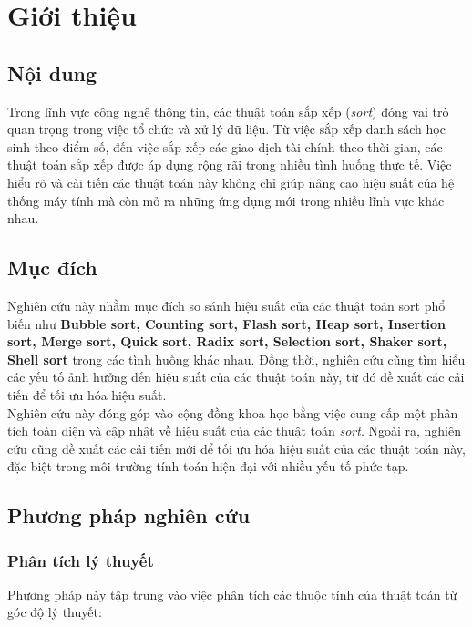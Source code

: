 \section{Giới thiệu}

\subsection{Nội dung}
Trong lĩnh vực công nghệ thông tin, các thuật toán sắp xếp (\textit{sort}) đóng vai trò quan trọng trong việc tổ chức và xử lý dữ liệu. Từ việc sắp xếp danh sách học sinh theo điểm số, đến việc sắp xếp các giao dịch tài chính theo thời gian, các thuật toán sắp xếp được áp dụng rộng rãi trong nhiều tình huống thực tế. Việc hiểu rõ và cải tiến các thuật toán này không chỉ giúp nâng cao hiệu suất của hệ thống máy tính mà còn mở ra những ứng dụng mới trong nhiều lĩnh vực khác nhau.
\subsection{Mục đích}
Nghiên cứu này nhằm mục đích so sánh hiệu suất của các thuật toán sort phổ biến như \textbf{Bubble sort, Counting sort, Flash sort, Heap sort, Insertion sort, Merge sort, Quick sort, Radix sort, Selection sort, Shaker sort, Shell sort} trong các tình huống khác nhau. Đồng thời, nghiên cứu cũng tìm hiểu các yếu tố ảnh hưởng đến hiệu suất của các thuật toán này, từ đó đề xuất các cải tiến để tối ưu hóa hiệu suất.\\
Nghiên cứu này đóng góp vào cộng đồng khoa học bằng việc cung cấp một phân tích toàn diện và cập nhật về hiệu suất của các thuật toán \textit{sort}. Ngoài ra, nghiên cứu cũng đề xuất các cải tiến mới để tối ưu hóa hiệu suất của các thuật toán này, đặc biệt trong môi trường tính toán hiện đại với nhiều yếu tố phức tạp.

\subsection{Phương pháp nghiên cứu}

\subsubsection{Phân tích lý thuyết}
Phương pháp này tập trung vào việc phân tích các thuộc tính của thuật toán từ góc độ lý thuyết:

